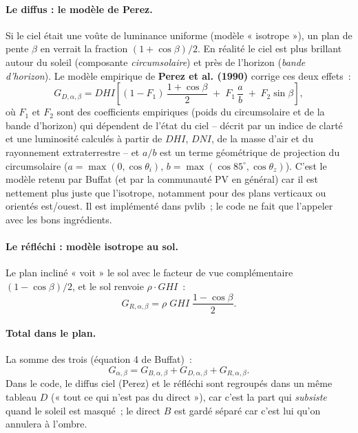\documentclass[11pt,a4paper]{article}
\begin{document}
\paragraph{Le diffus : le modèle de Perez.} Si le ciel était une voûte de
luminance uniforme (modèle « isotrope »), un plan de pente $\beta$ en verrait la
fraction $(1+\cos\beta)/2$. En réalité le ciel est plus brillant autour du
soleil (composante \emph{circumsolaire}) et près de l'horizon (\emph{bande
d'horizon}). Le modèle empirique de \textbf{Perez et al. (1990)} corrige ces
deux effets~:
\begin{equation}
  G_{D,\alpha,\beta} = DHI\left[(1-F_1)\,\frac{1+\cos\beta}{2}
      \;+\; F_1\,\frac{a}{b} \;+\; F_2\sin\beta\right],
  \label{eq:perez}
\end{equation}
où $F_1$ et $F_2$ sont des coefficients empiriques (poids du circumsolaire et de
la bande d'horizon) qui dépendent de l'état du ciel -- décrit par un indice de
clarté et une luminosité calculés à partir de $DHI$, $DNI$, de la masse d'air et
du rayonnement extraterrestre -- et $a/b$ est un terme géométrique de projection
du circumsolaire ($a = \max(0,\cos\theta_i)$, $b = \max(\cos 85^\circ,
\cos\theta_z)$). C'est le modèle retenu par Buffat (et par la communauté PV en
général) car il est nettement plus juste que l'isotrope, notamment pour des
plans verticaux ou orientés est/ouest. Il est implémenté dans pvlib~; le code ne
fait que l'appeler avec les bons ingrédients.

\paragraph{Le réfléchi : modèle isotrope au sol.} Le plan incliné « voit » le
sol avec le facteur de vue complémentaire $(1-\cos\beta)/2$, et le sol renvoie
$\rho \cdot GHI$~:
\begin{equation}
  G_{R,\alpha,\beta} = \rho \; GHI \; \frac{1-\cos\beta}{2}.
  \label{eq:reflechi}
\end{equation}

\paragraph{Total dans le plan.} La somme des trois (équation 4 de Buffat)~:
\begin{equation}
  G_{\alpha,\beta} = G_{B,\alpha,\beta} + G_{D,\alpha,\beta} + G_{R,\alpha,\beta}.
\end{equation}
Dans le code, le diffus ciel (Perez) et le réfléchi sont regroupés dans un même
tableau $D$ (« tout ce qui n'est pas du direct »), car c'est la part qui
\emph{subsiste} quand le soleil est masqué~; le direct $B$ est gardé séparé car
c'est lui qu'on annulera à l'ombre.
\end{document}
